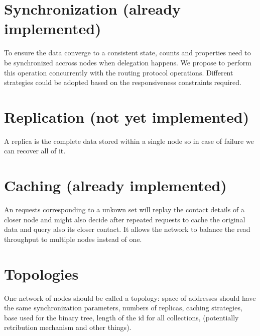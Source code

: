 \documentclass[11pt]{article}
\begin{document}
\section*{Synchronization (already implemented)}
To ensure the data converge to a consistent state, counts and properties need to be synchronized accross nodes when delegation happens. We propose to perform this operation concurrently with the routing protocol operations. Different strategies could be adopted based on the responsiveness constraints required. 

\section*{Replication (not yet implemented)}
A replica is the complete data stored within a single node so in case of failure we can recover all of it.

\section*{Caching (already implemented)}
An requests corresponding to a unkown set will replay the contact details of a closer node and might also decide after repeated requests to cache the original data and query also its closer contact. It allows the network to balance the read throughput to multiple nodes instead of one.

\section*{Topologies}
One network of nodes should be called a topology: space of addresses should have the same synchronization parameters, numbers of replicas, caching strategies, base used for the binary tree, length of the id for all collections, (potentially retribution mechanism and other things).
\end{document}
